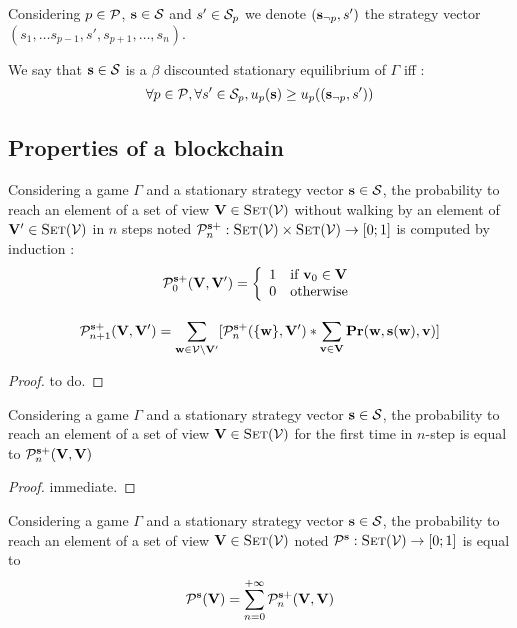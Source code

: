 Considering $p \in \mathcal{P}$, $\mathbf{s} \in \mathcal{S}$ and $s'\in \mathcal{S}_p$ we denote $(\mathbf{s}_{\neg p}, s')$ the strategy vector $(s_1, \ldots s_{p-1},s',s_{p+1}, \ldots, s_{n})$.
\begin{mydef}
	We say that $\mathbf{s} \in \mathcal{S}$ is a $\beta$ discounted stationary equilibrium of $\Gamma$ iff : 
	$$\forall p \in \mathcal{P}, \forall s' \in \mathcal{S}_p,  u_p(\mathbf{s}) \geq u_p((\mathbf{s}_{\neg p},s')) $$
\end{mydef}

\subsection{Properties of a blockchain}

\begin{mylem}
	Considering a game $\Gamma$ and a stationary strategy vector $\mathbf{s} \in \mathcal{S}$, 
	the probability to reach an element of a set of view $\mathbf{V} \in \text{\sc Set}(\mathcal{V})$  without walking by an element of $\mathbf{V}' \in \text{\sc Set}(\mathcal{V})$ in $n$ steps noted $\mathcal{P}^{\mathbf{s}+}_n : \text{\sc Set}(\mathcal{V}) \times \text{\sc Set}(\mathcal{V}) \rightarrow [0;1]$ is computed by induction :
	$$\mathcal{P}^{\mathbf{s}+}_0(\mathbf{V},\mathbf{V}') = \left\{\begin{array}{ll}
	1 & \mbox{if } \mathbf{v}_0 \in \mathbf{V} \\
	0 & \mbox{otherwise}
	\end{array}\right.$$
	
	$$\mathcal{P}^{\mathbf{s}+}_{n+1}(\mathbf{V},\mathbf{V}') = \sum_{\mathbf{w} \in \mathcal{V} \setminus \mathbf{V}'}   [\mathcal{P}^{\mathbf{s}+}_{n}(\{\mathbf{w}\},\mathbf{V}') * \sum_{\mathbf{v} \in \mathbf{V}}^{}\mathbf{Pr}(\mathbf{w},\mathbf{s}(\mathbf{w}),\mathbf{v}) ]$$
\end{mylem}

\begin{proof}
	to do.
\end{proof}

\begin{mylem}
	Considering a game $\Gamma$ and a stationary strategy vector $\mathbf{s} \in \mathcal{S}$, 
	the probability to reach an element of a set of view $\mathbf{V} \in \text{\sc Set}(\mathcal{V})$ for the first time in $n$-step is equal to $\mathcal{P}^{\mathbf{s}+}_n(\mathbf{V},\mathbf{V})$
\end{mylem}

\begin{proof}
	immediate.
\end{proof}

\begin{myprop}
	Considering a game $\Gamma$ and a stationary strategy vector $\mathbf{s} \in \mathcal{S}$, 
	the probability to reach an element of a set of view $\mathbf{V} \in \text{\sc Set}(\mathcal{V})$ noted  $\mathcal{P}^{\mathbf{s}} : \text{\sc Set}(\mathcal{V}) \rightarrow [0;1]$ is equal to $$\mathcal{P}^{\mathbf{s}}(\mathbf{V}) = \sum_{n=0}^{+\infty}\mathcal{P}^{\mathbf{s}+}_n(\mathbf{V},\mathbf{V})$$
\end{myprop}

